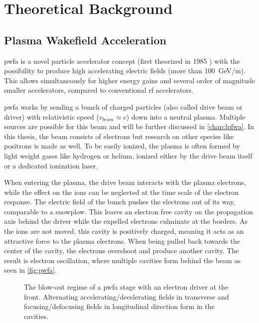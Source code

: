 \documentclass[bachelor_thesis]{subfiles}
\begin{document}
\chapter{Theoretical Background}
\section{Plasma Wakefield Acceleration}
\Gls{pwfa} is a novel particle accelerator concept (first theorized in 1985 \cite{Chen1985}) with the possibility to produce high accelerating electric fields (more than \qty{100}{\GeV/\m}). This allows simultaneously for higher energy gains 
and several order of magnitude smaller accelerators, compared to conventional \gls{rf} accelerators.

\Gls{pwfa} works by sending a bunch of charged particles (also called drive beam or driver) with relativistic speed ($v_{beam}\approx c$) down into a neutral plasma. Multiple sources are possible for this beam and will be further discussed in \autoref{chap:lpfwa}.
In this thesis, the beam consists of electrons but research on other species like positrons \cite{Gessner2016} is made as well. To be easily ionized, the plasma is often formed by light weight gases like hydrogen or helium, ionized either by the drive beam itself or a dedicated ionization laser.

When entering the plasma, the drive beam interacts with the plasma electrons, while the effect on the ions can be neglected at the time scale of the electron response. The electric field of the bunch pushes the electrons out of its way, comparable to a snowplow. 
This leaves an electron free cavity on the propagation axis behind the driver while the expelled electrons culminate at the borders. As the ions are not moved, this cavity is positively charged, meaning it acts as an attractive force to the plasma electrons.
When being pulled back towards the center of the cavity, the electrons overshoot and produce another cavity. The result is electron oscillation, where multiple cavities form behind the beam as seen in \autoref{fig:pwfa}.

\begin{figure}
	\centering
	\missingfigure{}
	\caption{The blow-out regime of a \gls{pwfa} stage with an electron driver at the front. Alternating accelerating/decelerating fields in transverse and focusing/defocusing fields in longitudinal direction form in the cavities.}
	\label{fig:pwfa}
\end{figure}
\end{document}
